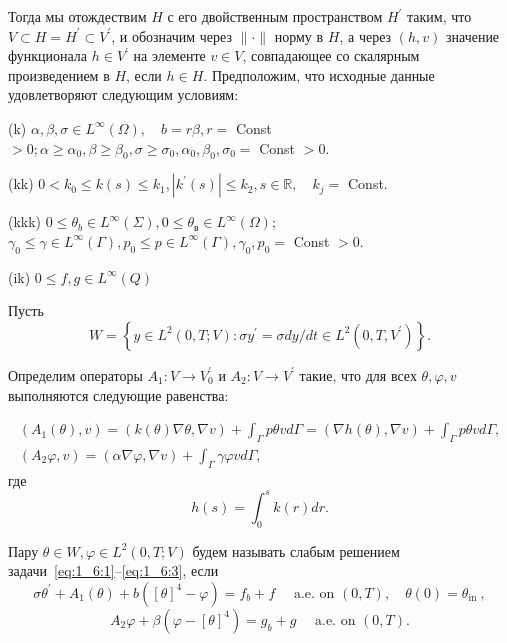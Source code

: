 Тогда мы отождествим $H$ с его двойственным пространством $H^{\prime}$
таким, что $V \subset H=H^{\prime} \subset V^{\prime}$,
и обозначим через $\|\cdot\|$ норму в $H$, а через $(h, v)$ значение
функционала $h \in V^{\prime}$ на элементе $v \in V$, совпадающее
со скалярным произведением в $H$, если $h \in H$.
Предположим, что исходные данные удовлетворяют следующим условиям:

(k) $\alpha, \beta, \sigma \in L^{\infty}(\Omega),
\quad b=r \beta, r=$ Const $>0 ; \alpha \geq \alpha_{0}, \beta \geq \beta_{0},
\sigma \geq \sigma_{0}, \alpha_{0}, \beta_{0}, \sigma_{0}=$ Const $>0$.

(kk) $0<k_{0} \leq k(s) \leq k_{1},\left|k^{\prime}(s)\right| \leq k_{2},
s \in \mathbb{R}, \quad k_{j}=$ Const.

(kkk) $0 \leq \theta_{b} \in L^{\infty}(\Sigma), 0 \leq \theta_{\text{в}}
\in L^{\infty}(\Omega)$; $\gamma_{0} \leq \gamma \in L^{\infty}(\Gamma), p_{0}
\leq p \in L^{\infty}(\Gamma), \gamma_{0}, p_{0}=$ Const $>0$.

(ik) $0 \leq f, g \in L^{\infty}(Q)$

Пусть
\[
    W=\left\{y \in L^{2}(0, T ; V): \sigma y^{\prime}=\sigma d y / d t \in L^{2}
    \left(0, T, V^{\prime}\right)\right\}.
\]


Определим операторы $A_{1}: V \rightarrow V_{0}^{\prime}$ и $A_{2}: V \rightarrow V^{\prime}$
такие, что для всех $\theta, \varphi, v$ выполняются следующие равенства:

\[
    \begin{gathered}
        \left(A_{1}(\theta), v\right)=(k(\theta) \nabla \theta, \nabla v)
        +\int_{\Gamma} p \theta v d \Gamma=(\nabla h(\theta), \nabla v)
        +\int_{\Gamma} p \theta v d \Gamma, \\
        \left(A_{2} \varphi, v\right)=(\alpha \nabla \varphi, \nabla v)
        +\int_{\Gamma} \gamma \varphi v d \Gamma,
    \end{gathered}
\]
где
\[
    h(s)=\int_{0}^{s} k(r) d r.
\]

\begin{definition}
    Пару $\theta \in W, \varphi \in L^{2}(0, T ; V)$ будем называть слабым
    решением задачи~\eqref{eq:1_6:1}--\eqref{eq:1_6:3}, если
    \begin{equation}
        \label{eq:1_6:4}
        \sigma \theta^{\prime}+A_{1}(\theta)+b\left([\theta]^{4}-\varphi\right)=f_{b}+f
        \quad \text { a.e. on }(0, T), \quad \theta(0)=\theta_{\text {in }},
    \end{equation}
    \begin{equation}
        \label{eq:1_6:5}
        A_{2} \varphi+\beta\left(\varphi-[\theta]^{4}\right)
        =g_{b}+g \quad \text { a.e. on }(0, T).
    \end{equation}
\end{definition}

